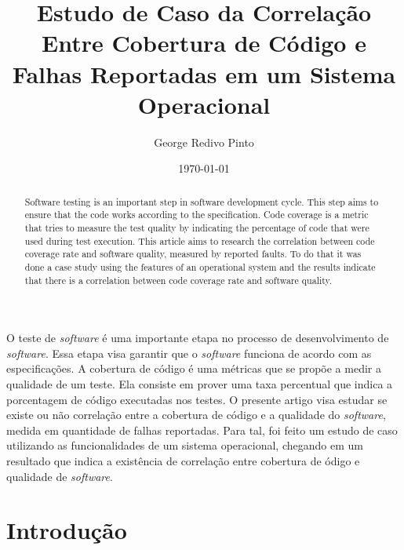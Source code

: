 \documentclass[11.5pt]{article}
\date{\today}
\title{
    Estudo de Caso da Correlação Entre Cobertura de Código e Falhas Reportadas em um Sistema
    Operacional
}
\author{George Redivo Pinto}
\begin{document}
\imprimircapa
\imprimirfolhaderosto

\maketitle

\begin{abstract}

Software testing is an important step in software development cycle. This step aims to ensure that
the code works according to the specification.
Code coverage is a metric that tries to measure the test quality by indicating the percentage of
code that were used during test execution.
This article aims to research the correlation between code coverage rate and software quality,
measured by reported faults.
To do that it was done a case study using the features of an operational system and the results
indicate that there is a correlation between code coverage rate and software quality.

\end{abstract}

\begin{resumo}

O teste de \textit{software} é uma importante etapa no processo de desenvolvimento de \textit{software}. Essa etapa
visa garantir que o \textit{software} funciona de acordo com as especificações.
A cobertura de código é uma métricas que se propõe a medir a qualidade de um teste. Ela consiste em
prover uma taxa percentual que indica a porcentagem de código executadas nos testes.
O presente artigo visa estudar se existe ou não correlação entre a cobertura de código e a
qualidade do \textit{software}, medida em quantidade de falhas reportadas.
Para tal, foi feito um estudo de caso utilizando as funcionalidades de um sistema operacional,
chegando em um resultado que indica a existência de correlação entre cobertura de ódigo e
qualidade de \textit{software}.


\end{resumo}




\section{Introdução}
\end{document}

